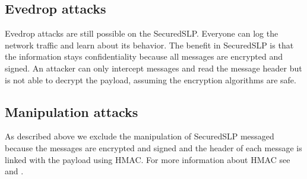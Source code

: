 \subsection{Evedrop attacks}
Evedrop attacks are still possible on the SecuredSLP. Everyone can log the
network traffic and learn about its behavior. The benefit in SecuredSLP is that
the information stays confidentiality because all messages are encrypted and
signed. An attacker can only intercept messages and read the message header but
is not able to decrypt the payload, assuming the encryption algorithms
are safe.

\subsection{Manipulation attacks}
As described above we exclude the manipulation of SecuredSLP messaged because
the messages are encrypted and signed and the header of each message is linked with
the payload using HMAC. For more information about HMAC see \cite{Kraw97} and
\cite{Kero00}.